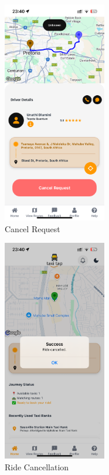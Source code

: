 \documentclass[12pt]{article}
\begin{document}
\begin{figure}[H]
  \centering
  \includegraphics[width=0.4\textwidth]{cancel_request.png}
  \caption{Cancel Request}
\end{figure}

\begin{figure}[H]
  \centering
  \includegraphics[width=0.4\textwidth]{ride_cancelled.png}
  \caption{Ride Cancellation}
\end{figure}
\end{document}
